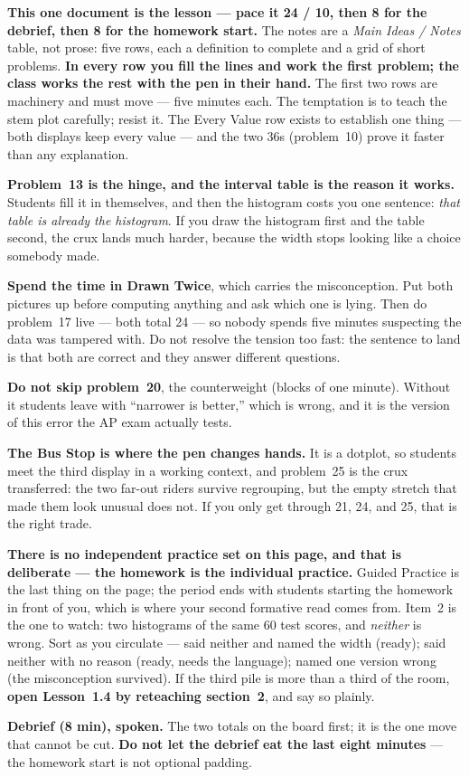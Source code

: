 \documentclass[10pt]{article}
\begin{document}
\begin{teachernote}
\textbf{This one document is the lesson --- pace it 24 / 10, then 8 for the debrief, then 8 for
the homework start.} The notes are a \emph{Main Ideas / Notes} table, not prose: five rows, each
a definition to complete and a grid of short problems. \textbf{In every row you fill the lines
and work the first problem; the class works the rest with the pen in their hand.} The first two
rows are machinery and must move --- five minutes each. The temptation is to teach the stem plot
carefully; resist it. The Every Value row exists to establish one thing --- both displays keep
every value --- and the two 36s (problem~10) prove it faster than any explanation.

\textbf{Problem~13 is the hinge, and the interval table is the reason it works.} Students fill
it in themselves, and then the histogram costs you one sentence: \emph{that table is already the
histogram}. If you draw the histogram first and the table second, the crux lands much harder,
because the width stops looking like a choice somebody made.

\textbf{Spend the time in Drawn Twice}, which carries the misconception. Put both pictures up
before computing anything and ask which one is lying. Then do problem~17 live --- both total
24 --- so nobody spends five minutes suspecting the data was tampered with. Do not resolve the
tension too fast: the sentence to land is that both are correct and they answer different
questions.

\textbf{Do not skip problem~20}, the counterweight (blocks of one minute). Without it students
leave with ``narrower is better,'' which is wrong, and it is the version of this error the AP
exam actually tests.

\textbf{The Bus Stop is where the pen changes hands.} It is a dotplot, so students meet the third
display in a working context, and problem~25 is the crux transferred: the two far-out riders
survive regrouping, but the empty stretch that made them look unusual does not. If you only get
through 21, 24, and 25, that is the right trade.

\textbf{There is no independent practice set on this page, and that is deliberate --- the
homework is the individual practice.} Guided Practice is the last thing on the page; the period
ends with students starting the homework in front of you, which is where your second formative
read comes from. Item~2 is the one to watch: two histograms of the same 60 test scores, and
\emph{neither} is wrong. Sort as you circulate --- said neither and named the width (ready);
said neither with no reason (ready, needs the language); named one version wrong (the
misconception survived). If the third pile is more than a third of the room, \textbf{open
Lesson~1.4 by reteaching section~2}, and say so plainly.

\textbf{Debrief (8 min), spoken.} The two totals on the board first; it is the one move that
cannot be cut. \textbf{Do not let the debrief eat the last eight minutes} --- the homework start
is not optional padding.
\end{teachernote}
\end{document}
